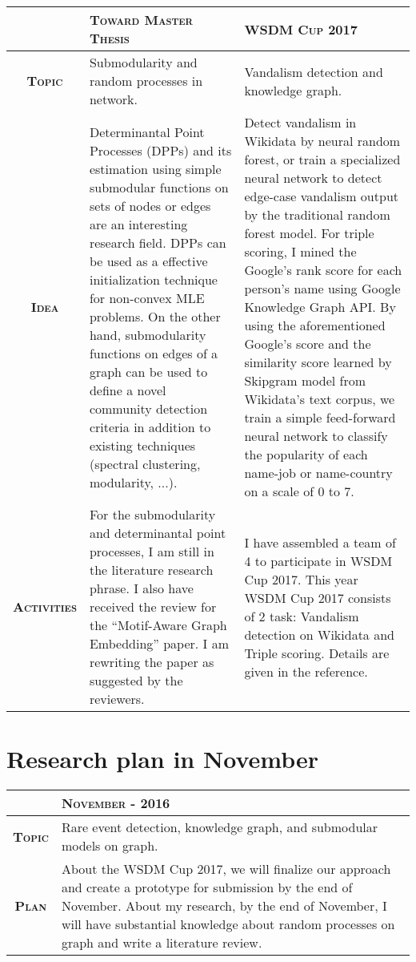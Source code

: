 \documentclass[12pt,twoside]{article}
\begin{document}
\begin{center}
  \renewcommand{\arraystretch}{1.5}
  \begin{longtable}{| c | p{6.5cm} | p{6.5cm} |}
  \hline
  & \textbf{\textsc{Toward Master Thesis}} & \textbf{\textsc{WSDM Cup 2017}} \\ \hline
  \textbf{\textsc{Topic}} & Submodularity and random processes in network. & 
  Vandalism detection and knowledge graph.\\ \hline
  \textbf{\textsc{Idea}} & Determinantal Point Processes (DPPs) and its estimation
  using simple submodular functions on sets of nodes or edges are an interesting
  research field. DPPs can be used as a effective initialization technique for
  non-convex MLE problems. On the other hand, submodularity functions on edges
  of a graph can be used to define a novel community detection criteria in
  addition to existing techniques (spectral clustering, modularity, ...).
  & Detect vandalism in Wikidata by
  neural random forest, or train a specialized neural network
  to detect edge-case vandalism output by the traditional random
  forest model. For triple scoring, I mined the Google's rank score
  for each person's name using Google Knowledge Graph API. By using
  the aforementioned Google's score and the similarity score
  learned by Skipgram model from Wikidata's text corpus, we train
  a simple feed-forward neural network to classify the popularity
  of each name-job or name-country on a scale of 0 to 7. \\ \hline
  \textbf{\textsc{Activities}} & For the submodularity and determinantal point
  processes, I am still in the literature research phrase. I also have received
  the review for the ``Motif-Aware Graph Embedding'' paper. I am rewriting the
  paper as suggested by the reviewers.
  & I have assembled a team
  of 4 to participate
  in WSDM Cup 2017. This year WSDM Cup 2017 consists of 2 task:
  Vandalism detection on Wikidata and Triple scoring. Details
  are given in the reference.\\ \hline
  \end{longtable}
\end{center}

\section{Research plan in November}

\begin{center}
  \renewcommand{\arraystretch}{1.5}
  \begin{longtable}{| c | p{12cm} |}
  \hline
  & \textbf{\textsc{November - 2016}} \\ \hline
  \textbf{\textsc{Topic}} & Rare event detection, knowledge graph,
  and submodular models on graph.\\ \hline
  \textbf{\textsc{Plan}} & About the WSDM Cup 2017, we will finalize our approach
  and create a prototype for submission by the end of November. About my research,
  by the end of November, I will have substantial knowledge about random processes
  on graph and write a literature review.
  \\ \hline
  \end{longtable}
\end{center}
\end{document}
